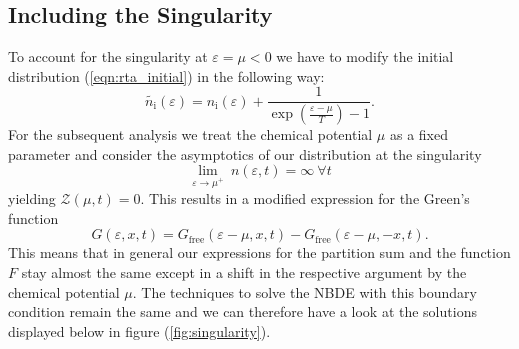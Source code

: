 \subsection{Including the Singularity}
To account for the singularity at $\varepsilon=\mu <0$ we have to modify the initial distribution (\ref{eqn:rta_initial}) in the following way:
\begin{equation}
		\tilde{n_{\mathrm{i}}}(\varepsilon) = n_{\mathrm{i}}(\varepsilon) + \frac{1}{\exp\left(\frac{\varepsilon-\mu}{T}\right)-1}.
	\end{equation}
For the subsequent analysis we treat the chemical potential $\mu$ as a fixed parameter and consider the asymptotics of 	our distribution at the singularity
\begin{equation}
	 \lim_{\varepsilon\rightarrow\mu^{+}}\ n(\varepsilon,t) = \infty\ \forall t 
\end{equation} 
yielding $\mathcal{Z}(\mu,t) = 0$. This results in a modified expression for the Green's function 
 	\begin{equation}
		G(\varepsilon,x,t) = G_{\mathrm{free}}(\varepsilon-\mu,x,t) - G_{\mathrm{free}}(\varepsilon-\mu,-x,t).
\end{equation}
This means that in general our expressions for the partition sum and the function $F$ stay almost the same except in a shift in the respective argument by the chemical potential $\mu$. The techniques to solve the NBDE with this boundary condition remain the same and we can therefore have a look at the solutions displayed below in figure (\ref{fig:singularity}).
